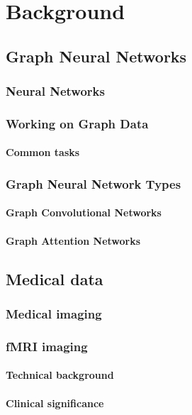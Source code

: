 \chapter{Background}

\section{Graph Neural Networks}

	\subsection{Neural Networks}
	
	\subsection{Working on Graph Data}
	
		\subsubsection{Common tasks}
	
	\subsection{Graph Neural Network Types}
		\subsubsection{Graph Convolutional Networks}
		\subsubsection{Graph Attention Networks}
	
\section{Medical data}

	\subsection{Medical imaging}
	
	\subsection{fMRI imaging}
	
		\subsubsection{Technical background}
		
		\subsubsection{Clinical significance }